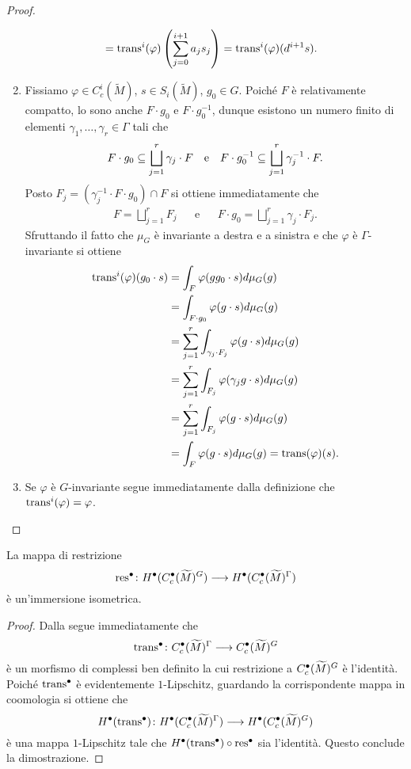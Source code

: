\begin{proof}
\begin{enumerate}
\begin{align*}
&=\operatorname{trans}^i(\varphi)\left(\sum_{j=0}^{i+1}a_js_j\right)=\operatorname{trans}^i(\varphi)(d^{i+1}s).
\end{align*}
\item Fissiamo $\varphi\in C^i_c(\widetilde M)$, $s\in S_i(\widetilde M)$, $g_0\in G$. Poiché $F$ è relativamente compatto, lo sono anche $F\cdot g_0$ e $F\cdot g_0^{-1}$, dunque esistono un numero finito di elementi $\gamma_1,\ldots,\gamma_r\in\Gamma$ tali che
\begin{align*}
F\cdot g_0\subseteq\bigsqcup_{j=1}^r\gamma_j\cdot F&&\text{e}&&F\cdot g_0^{-1}\subseteq\bigsqcup_{j=1}^r\gamma_j^{-1}\cdot F.
\end{align*}
Posto $F_j=(\gamma_j^{-1}\cdot F\cdot g_0)\cap F$ si ottiene immediatamente che
\begin{align*}
F=\bigsqcup_{j=1}^rF_j&&\text{e}&&F\cdot g_0=\bigsqcup_{j=1}^r\gamma_j\cdot F_j.
\end{align*}
Sfruttando il fatto che $\mu_G$ è invariante a destra e a sinistra e che $\varphi$ è $\Gamma$-invariante si ottiene
\begin{align*}
\operatorname{trans}^i(\varphi)(g_0\cdot s)&=\int_F\varphi(gg_0\cdot s)d\mu_G(g)\\
&=\int_{F\cdot g_0}\varphi(g\cdot s)d\mu_G(g)\\
&=\sum_{j=1}^r\int_{\gamma_j\cdot F_j}\varphi(g\cdot s)d\mu_G(g)\\
&=\sum_{j=1}^r\int_{F_j}\varphi(\gamma_jg\cdot s)d\mu_G(g)\\
&=\sum_{j=1}^r\int_{F_j}\varphi(g\cdot s)d\mu_G(g)\\
&=\int_F\varphi(g\cdot s)d\mu_G(g)=\operatorname{trans}(\varphi)(s).
\end{align*}
\item Se $\varphi$ è $G$-invariante segue immediatamente dalla definizione che $\operatorname{trans}^i(\varphi)=\varphi$.
\end{enumerate}
\end{proof}

\begin{corollary}
La mappa di restrizione
\[
\map{\res^\bul}{H^\bul(C^\bul_c(\widetilde M)^G)}{H^\bul(C^\bul_c(\widetilde M)^\Gamma)}
\]
è un'immersione isometrica.
\end{corollary}
\begin{proof}
Dalla  segue immediatamente che
\[
\map{\trans^\bul}{C^\bul_c(\widetilde M)^\Gamma}{C^\bul_c(\widetilde M)^G}
\]
è un morfismo di complessi ben definito la cui restrizione a $C^\bullet_c(\widetilde M)^G$ è l'identità. Poiché $\operatorname{trans}^\bullet$ è evidentemente $1$-Lipschitz, guardando la corrispondente mappa in coomologia si ottiene che
\[
\map{H^\bul(\trans^\bul)}{H^\bul(C^\bul_c(\widetilde M)^\Gamma)}{H^\bul(C^\bul_c(\widetilde M)^G)}
\]
è una mappa $1$-Lipschitz tale che $H^\bullet(\operatorname{trans}^\bullet)\circ \operatorname{res}^\bullet$ sia l'identità. Questo conclude la dimostrazione.
\end{proof}

